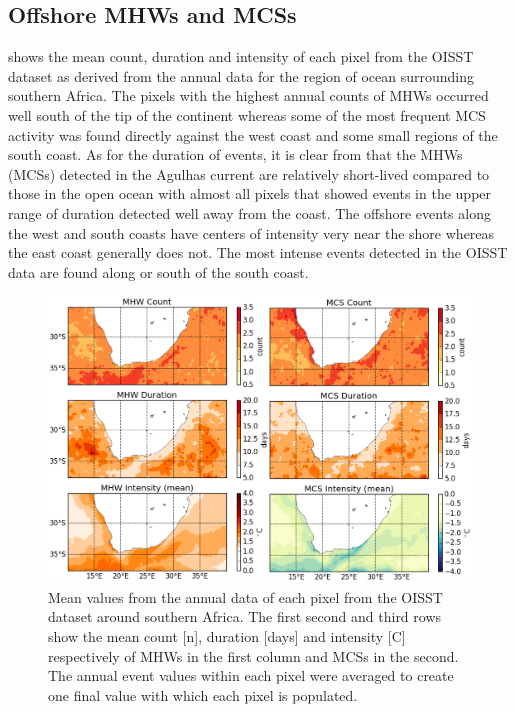 \documentclass[a4paper,10pt,review]{elsarticle}
\begin{document}
\subsection{Offshore MHWs and MCSs}
 shows the mean count, duration and intensity of each pixel from the OISST dataset as derived from the annual data for the region of ocean surrounding southern Africa. The pixels with the highest annual counts of MHWs occurred well south of the tip of the continent whereas some of the most frequent MCS activity was found directly against the west coast and some small regions of the south coast. As for the duration of events, it is clear from  that the MHWs (MCSs) detected in the Agulhas current are relatively short-lived compared to those in the open ocean with almost all pixels that showed events in the upper range of duration detected well away from the coast. The offshore events along the west and south coasts have centers of intensity very near the shore whereas the east coast generally does not. The most intense events detected in the OISST data are found along or south of the south coast.

\begin{figure}
\centering \includegraphics[width=1.0\textwidth]{MHW_MCS_mean.png}
\caption{Mean values from the annual data of each pixel from the OISST dataset around southern Africa. The first second and third rows show the mean count [n], duration [days] and intensity [\degree C] respectively of MHWs in the first column and MCSs in the second. The annual event values within each pixel were averaged to create one final value with which each pixel is populated.}
\label{fig:Figure6}
\end{figure}
\end{document}
